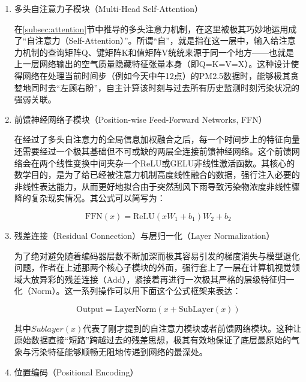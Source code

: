 \begin{enumerate}[label=（\arabic*）, leftmargin=0pt, itemindent=4.5em, labelsep=0.5em, listparindent=2em, parsep=0pt]

	\item 多头自注意力子模块（Multi-Head Self-Attention）
	
	在\cref{subsec:attention}节中推导的多头注意力机制，在这里被极其巧妙地运用成了“自注意力（Self-Attention）”。所谓“自”，就是指在这一层中，输入给注意力机制的查询矩阵Q、键矩阵K和值矩阵V统统来源于同一个地方——也就是上一层网络输出的空气质量隐藏特征张量本身（即Q=K=V=X）。这种设计使得网络在处理当前时间步（例如今天中午12点）的PM2.5数据时，能够极其贪婪地同时去“左顾右盼”，自主计算该时刻与过去所有历史监测时刻污染状况的强弱关联。

    \item 前馈神经网络子模块（Position-wise Feed-Forward Networks, FFN）
    
    在经过了多头自注意力的全局信息加权融合之后，每一个时间步上的特征向量还需要经过一个极其基础但不可或缺的两层全连接前馈神经网络。这个前馈网络会在两个线性变换中间夹杂一个ReLU或GELU非线性激活函数。其核心的数学目的，是为了给已经被注意力机制高度线性融合的数据，强行注入必要的非线性表达能力，从而更好地拟合由于突然刮风下雨导致污染物浓度非线性骤降的复杂现实情况。其公式可以简写为：

    \begin{equation}\label{eq:FFN}
        \text{FFN}(x) = \text{ReLU}(xW_1 + b_1)W_2 + b_2
    \end{equation}

    \item 残差连接（Residual Connection）与层归一化（Layer Normalization）
    
    为了绝对避免随着编码器层数不断加深而极其容易引发的梯度消失与模型退化问题，作者在上述那两个核心子模块的外面，强行套上了一层在计算机视觉领域大放异彩的残差连接（Add），紧接着再进行一次极其严格的层级特征归一化（Norm）。这一系列操作可以用下面这个公式框架来表达：

    \begin{equation}\label{eq:Residual_LayerNorm}
        \text{Output} = \text{LayerNorm}(x + \text{SubLayer}(x))
    \end{equation}

    其中$Sublayer(x)$代表了刚才提到的自注意力模块或者前馈网络模块。这种让原始数据直接“短路”跨越过去的残差思想，极其有效地保证了底层最原始的气象与污染特征能够顺畅无阻地传递到网络的最深处。

    \item 位置编码（Positional Encoding）
    

\end{enumerate}

